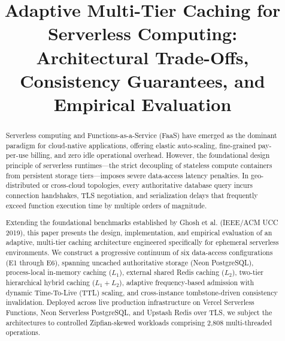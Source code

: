 \documentclass[conference]{IEEEtran}
\begin{document}
\title{Adaptive Multi-Tier Caching for Serverless Computing: Architectural Trade-Offs, Consistency Guarantees, and Empirical Evaluation}

\author{
}

\maketitle

\begin{abstract}
Serverless computing and Functions-as-a-Service (FaaS) have emerged as the dominant paradigm for cloud-native applications, offering elastic auto-scaling, fine-grained pay-per-use billing, and zero idle operational overhead. However, the foundational design principle of serverless runtimes---the strict decoupling of stateless compute containers from persistent storage tiers---imposes severe data-access latency penalties. In geo-distributed or cross-cloud topologies, every authoritative database query incurs connection handshakes, TLS negotiation, and serialization delays that frequently exceed function execution time by multiple orders of magnitude. 

Extending the foundational benchmarks established by Ghosh et al. (IEEE/ACM UCC 2019), this paper presents the design, implementation, and empirical evaluation of an adaptive, multi-tier caching architecture engineered specifically for ephemeral serverless environments. We construct a progressive continuum of six data-access configurations (E1 through E6), spanning uncached authoritative storage (Neon PostgreSQL), process-local in-memory caching ($L_1$), external shared Redis caching ($L_2$), two-tier hierarchical hybrid caching ($L_1 + L_2$), adaptive frequency-based admission with dynamic Time-To-Live (TTL) scaling, and cross-instance tombstone-driven consistency invalidation. Deployed across live production infrastructure on Vercel Serverless Functions, Neon Serverless PostgreSQL, and Upstash Redis over TLS, we subject the architectures to controlled Zipfian-skewed workloads comprising 2,808 multi-threaded operations.


\end{abstract}
\end{document}
